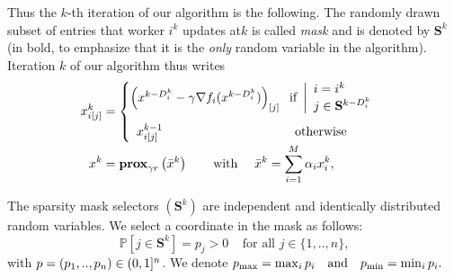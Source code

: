 Thus the $k$-th iteration of our algorithm is the following.
The randomly drawn subset of entries that worker $i^k$ updates at\;$k$ is called \emph{mask} and is denoted by $\mathbf{S}^k$ (in bold, to emphasize that it is the \emph{only} random variable in the algorithm).
Iteration $k$ of our algorithm thus writes
\begin{subequations}
 \begin{align*}
x_{i[j]}^k &= \left\{ 
\begin{array}{ll}
 \!\!\!\left( x^{k-D_i^k}    - \gamma \nabla f_i( x^{k-D_i^k}) \right)_{[j]}  \hspace*{-0.2cm}  &  \hspace*{0ex} \text{ if } \left| \begin{array}{l}
    i = i^k\\ j\in\mathbf{S}^{k-D_i^k}
 \end{array} \right.  \\[0.5cm]
x_{i[j]}^{k-1} & \hspace*{1ex}\text{ otherwise }
\end{array}
\right.
\\[-0.5ex]
x^k &= \rprox \left(\barx^k\right) \qquad \text{with }\quad \barx^k=\sum_{i=1}^M \alpha_i x_i^k ,
\end{align*}
\end{subequations}


\begin{assumption}
\label{hyp:algo}
The sparsity mask selectors $(\mathbf{S}^k)$ are independent and identically distributed random variables. We select a coordinate in the mask as follows:
\[
\mathbb{P}[j\in\mathbf{S}^k] = p_j > 0 ~~~~~ \text{for all $j\in\{1,..,n\}$,}
\]
with ${p} = (p_1,..,p_n) \in(0,1]^n$.
We denote
$
p_{\max} = \max_i p_i ~~~\text{and}~~~ p_{\min} = \min_i p_i.
$
\end{assumption}




